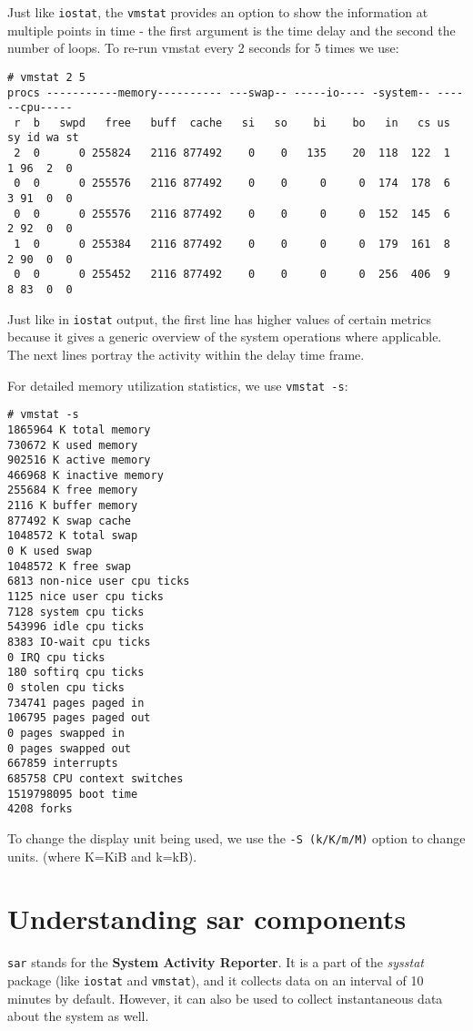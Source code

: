 \noindent
Just like \verb|iostat|, the \verb|vmstat| provides an option to show the information at multiple points in time - the first argument is the time delay and the second the number of loops. To re-run vmstat every 2 seconds for 5 times we use:

\vspace{-15pt}
\begin{verbatim}
# vmstat 2 5
procs -----------memory---------- ---swap-- -----io---- -system-- ------cpu-----
 r  b   swpd   free   buff  cache   si   so    bi    bo   in   cs us sy id wa st
 2  0      0 255824   2116 877492    0    0   135    20  118  122  1  1 96  2  0
 0  0      0 255576   2116 877492    0    0     0     0  174  178  6  3 91  0  0
 0  0      0 255576   2116 877492    0    0     0     0  152  145  6  2 92  0  0
 1  0      0 255384   2116 877492    0    0     0     0  179  161  8  2 90  0  0
 0  0      0 255452   2116 877492    0    0     0     0  256  406  9  8 83  0  0
\end{verbatim}
\vspace{-10pt}	

\noindent
Just like in \verb|iostat| output, the first line has higher values of certain metrics because it gives a generic overview of the system operations where applicable. The next lines portray the activity within the delay time frame. 

For detailed memory utilization statistics, we use \verb|vmstat -s|:

\vspace{-15pt}
\begin{verbatim}
# vmstat -s
1865964 K total memory
730672 K used memory
902516 K active memory
466968 K inactive memory
255684 K free memory
2116 K buffer memory
877492 K swap cache
1048572 K total swap
0 K used swap
1048572 K free swap
6813 non-nice user cpu ticks
1125 nice user cpu ticks
7128 system cpu ticks
543996 idle cpu ticks
8383 IO-wait cpu ticks
0 IRQ cpu ticks
180 softirq cpu ticks
0 stolen cpu ticks
734741 pages paged in
106795 pages paged out
0 pages swapped in
0 pages swapped out
667859 interrupts
685758 CPU context switches
1519798095 boot time
4208 forks
\end{verbatim}
\vspace{-10pt}	

\noindent
To change the display unit being used, we use the \verb|-S (k/K/m/M)| option to change units. (where K=KiB and k=kB). 

\section{Understanding sar components}
\verb|sar| stands for the \textbf{System Activity Reporter}. It is a part of the \textit{sysstat} package (like \verb|iostat| and \verb|vmstat|), and it collects data on an interval of 10 minutes by default. However, it can also be used to collect instantaneous data about the system as well. 

